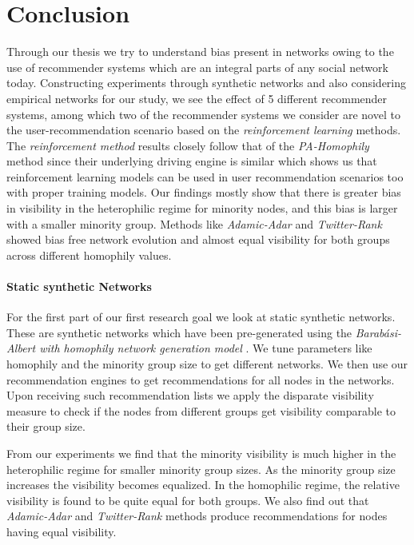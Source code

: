 \chapter{Conclusion}
\label{conclusions}
\thispagestyle{empty}

Through our thesis we try to understand bias present in networks owing to the use of recommender systems which are an integral parts of any social network today. Constructing experiments through synthetic networks and also considering empirical networks for our study, we see the effect of 5 different recommender systems, among which two of the recommender systems we consider are novel to the user-recommendation scenario based on the \textit{reinforcement learning} methods. The \textit{reinforcement method} results closely follow that of the \textit{PA-Homophily} method since their underlying driving engine is similar which shows us that reinforcement learning models can be used in user recommendation scenarios too with proper training models. Our findings mostly show that there is greater bias in visibility in the heterophilic regime for minority nodes, and this bias is larger with a smaller minority group. Methods like \textit{Adamic-Adar} and \textit{Twitter-Rank} showed bias free network evolution and almost equal visibility for both groups across different homophily values. 

\subsubsection{Static synthetic Networks}
For the first part of our first research goal we look at static synthetic networks. These are synthetic networks which have been pre-generated using the \textit{Barabási-Albert with homophily network generation model} \cite{karimi2018homophily}. We tune parameters like homophily and the minority group size to get different networks. We then use our recommendation engines to get recommendations for all nodes in the networks. Upon receiving such recommendation lists we apply the disparate visibility measure to check if the nodes from different groups get visibility comparable to their group size. 

From our experiments we find that the minority visibility is much higher in the heterophilic regime for smaller minority group sizes. As the minority group size increases the visibility becomes equalized. In the homophilic regime, the relative visibility is found to be quite equal for both groups. We also find out that \textit{Adamic-Adar} and \textit{Twitter-Rank} methods produce recommendations for nodes having equal visibility.

